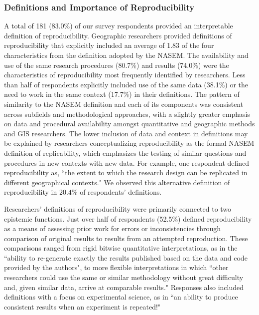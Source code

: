 \documentclass[]{interact}
\theoremstyle{plain}%
\theoremstyle{definition}
\theoremstyle{remark}
\begin{document}
\subsubsection*{Definitions and Importance of Reproducibility}
A total of 181 (83.0\%) of our survey respondents provided an interpretable definition of reproducibility.  
Geographic researchers provided definitions of reproducibility that explicitly included an average of 1.83 of the four characteristics from the definition adopted by the NASEM.
The availability and use of the same research procedures (80.7\%) and results (74.0\%) were the characteristics of reproducibility most frequently identified by researchers. 
Less than half of respondents explicitly included use of the same data (38.1\%) or the need to work in the same context (17.7\%) in their definitions. 
The pattern of similarity to the NASEM definition and each of its components was consistent across subfields and methodological approaches, with a slightly greater emphasis on data and procedural availability amongst quantitative and geographic methods and GIS researchers.
The lower inclusion of data and context in definitions may be explained by researchers conceptualizing reproducibility as the formal NASEM definition of replicability, which emphasizes the testing of similar questions and procedures in new contexts with new data. 
For example, one respondent defined reproducibility as, ``the extent to which the research design can be replicated in different geographical contexts."
We observed this alternative definition of reproducibility in 20.4\% of respondents' definitions.

Researchers' definitions of reproducibility were primarily connected to two epistemic functions.
Just over half of respondents (52.5\%) defined reproducibility as a means of assessing prior work for errors or inconsistencies through comparison of original results to results from an attempted reproduction.
These comparisons ranged from rigid bitwise quantitative interpretations, as in the ``ability to re-generate exactly the results published based on the data and code provided by the authors", to more flexible interpretations in which ``other researchers could use the same or similar methodology without great difficulty and, given similar data, arrive at comparable results."
Responses also included definitions with a focus on experimental science, as in ``an ability to produce consistent results when an experiment is repeated!"
\end{document}
